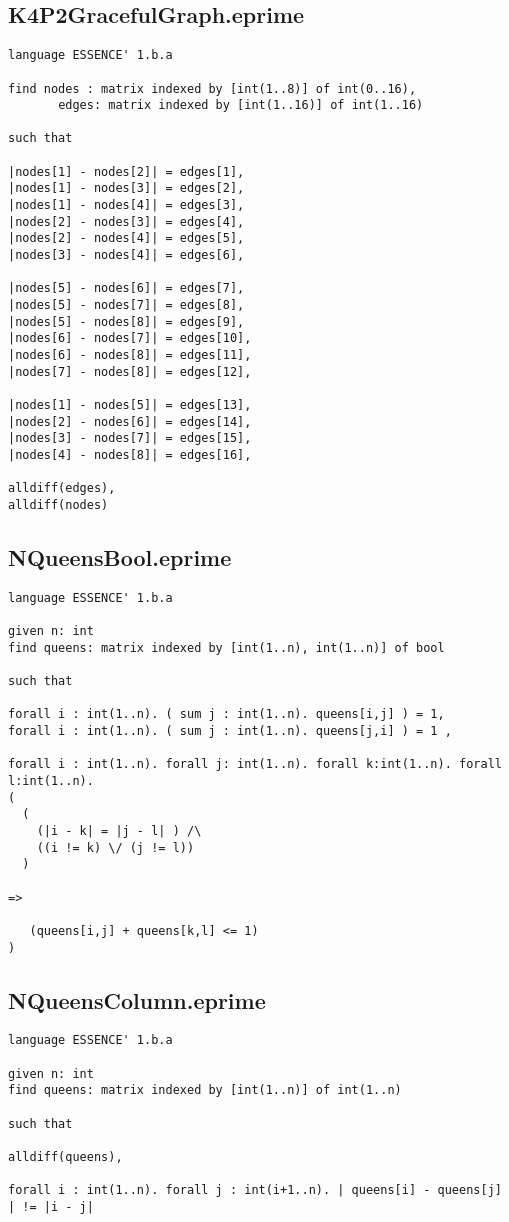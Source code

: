 \documentclass{article}
\begin{document}
\subsection{K4P2GracefulGraph.eprime}
\begin{verbatim}
language ESSENCE' 1.b.a

find nodes : matrix indexed by [int(1..8)] of int(0..16),
       edges: matrix indexed by [int(1..16)] of int(1..16)

such that

|nodes[1] - nodes[2]| = edges[1],
|nodes[1] - nodes[3]| = edges[2],
|nodes[1] - nodes[4]| = edges[3],
|nodes[2] - nodes[3]| = edges[4],
|nodes[2] - nodes[4]| = edges[5],
|nodes[3] - nodes[4]| = edges[6],

|nodes[5] - nodes[6]| = edges[7],
|nodes[5] - nodes[7]| = edges[8],
|nodes[5] - nodes[8]| = edges[9],
|nodes[6] - nodes[7]| = edges[10],
|nodes[6] - nodes[8]| = edges[11],
|nodes[7] - nodes[8]| = edges[12],

|nodes[1] - nodes[5]| = edges[13],
|nodes[2] - nodes[6]| = edges[14],
|nodes[3] - nodes[7]| = edges[15],
|nodes[4] - nodes[8]| = edges[16],

alldiff(edges),
alldiff(nodes)
\end{verbatim}
\subsection{NQueensBool.eprime}
\begin{verbatim}
language ESSENCE' 1.b.a

given n: int
find queens: matrix indexed by [int(1..n), int(1..n)] of bool

such that

forall i : int(1..n). ( sum j : int(1..n). queens[i,j] ) = 1,
forall i : int(1..n). ( sum j : int(1..n). queens[j,i] ) = 1 ,

forall i : int(1..n). forall j: int(1..n). forall k:int(1..n). forall l:int(1..n).
(
  ( 
    (|i - k| = |j - l| ) /\ 
    ((i != k) \/ (j != l)) 
  ) 

=> 

   (queens[i,j] + queens[k,l] <= 1)
)
\end{verbatim}
\subsection{NQueensColumn.eprime}
\begin{verbatim}
language ESSENCE' 1.b.a

given n: int
find queens: matrix indexed by [int(1..n)] of int(1..n)

such that

alldiff(queens),

forall i : int(1..n). forall j : int(i+1..n). | queens[i] - queens[j] | != |i - j|
\end{verbatim}
\end{document}
